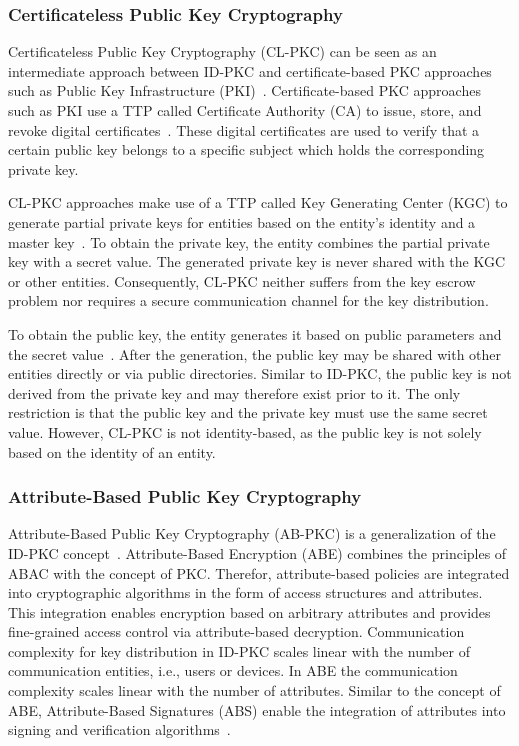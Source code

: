 \subsubsection{Certificateless Public Key Cryptography}
Certificateless Public Key Cryptography (CL-PKC) can be seen as an intermediate approach between ID-PKC and certificate-based PKC approaches such as Public Key Infrastructure (PKI)~\cite{AlRiyami2003}.
Certificate-based PKC approaches such as PKI use a TTP called Certificate Authority (CA) to issue, store, and revoke digital certificates~\cite{Eckert2023}.
These digital certificates are used to verify that a certain public key belongs to a specific subject which holds the corresponding private key.

CL-PKC approaches make use of a TTP called Key Generating Center (KGC) to generate partial private keys for entities based on the entity's identity and a master key~\cite{AlRiyami2003}.
To obtain the private key, the entity combines the partial private key with a secret value.
The generated private key is never shared with the KGC or other entities.
Consequently, CL-PKC neither suffers from the key escrow problem nor requires a secure communication channel for the key distribution.

To obtain the public key, the entity generates it based on public parameters and the secret value~\cite{AlRiyami2003}.
After the generation, the public key may be shared with other entities directly or via public directories.
Similar to ID-PKC, the public key is not derived from the private key and may therefore exist prior to it.
The only restriction is that the public key and the private key must use the same secret value.
However, CL-PKC is not identity-based, as the public key is not solely based on the identity of an entity.

\subsubsection{Attribute-Based Public Key Cryptography}
Attribute-Based Public Key Cryptography (AB-PKC) is a generalization of the ID-PKC concept~\cite{Sahai2005,Goyal2006,Hu2023}.
Attribute-Based Encryption (ABE) combines the principles of ABAC with the concept of PKC.
Therefor, attribute-based policies are integrated into cryptographic algorithms in the form of access structures and attributes.
This integration enables encryption based on arbitrary attributes and provides fine-grained access control via attribute-based decryption.
Communication complexity for key distribution in ID-PKC scales linear with the number of communication entities, i.e., users or devices.
In ABE the communication complexity scales linear with the number of attributes.
Similar to the concept of ABE, Attribute-Based Signatures (ABS) enable the integration of attributes into signing and verification algorithms~\cite{Li2010,Maji2011}.

